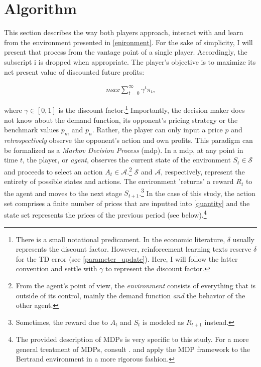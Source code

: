 \section{Algorithm}\label{algorithm}

This section describes the way both players approach, interact with and learn from the environment presented in \autoref{enironment}. For the sake of simplicity, I will present that process from the vantage point of a single player. Accordingly, the subscript {i} is dropped when appropriate. The player's objective is to maximize its net present value of discounted future profits:

\begin{gather}\label{maximization}
max \sum_{t = 0}^{\infty} \gamma^t \pi_{t} \text{,}
\end{gather}

where $\gamma \in [0, 1]$ is the discount factor.\footnote{There is a small notational predicament. In the economic literature, $\delta$ usually represents the discount factor. However, reinforcement learning texts reserve $\delta$ for the TD error (see \autoref{parameter_update}). Here, I will follow the latter convention and settle with $\gamma$ to represent the discount factor.} Importantly, the decision maker does not know about the demand function, its opponent's pricing strategy or the benchmark values $p_m$ and $p_n$. Rather, the player can only input a price $p$ and \emph{retrospectively} observe the opponent's action and own profits. This paradigm can be formalized as a \emph{Markov Decision Process} (\gls{mdp}). In a \gls{mdp}, at any point in time $t$, the player, or \emph{agent}, observes the current state of the environment $S_t \in \mathcal{S}$ and proceeds to select an action $A_t \in \mathcal{A}$.\footnote{From the agent's point of view, the \emph{environment} consists of everything that is outside of its control, mainly the demand function \emph{and} the behavior of the other agent.} $\mathcal{S}$ and $\mathcal{A}$, respectively, represent the entirety of possible states and actions. The environment 'returns' a reward $R_t$ to the agent and moves to the next stage $S_{t+1}$.\footnote{Sometimes, the reward due to $A_t$ and $S_t$ is modeled as $R_{t+1}$ instead.} In the case of this study, the action set comprises a finite number of prices  that are inputted into \autoref{quantity} and the state set represents the prices of the previous period (see below).\footnote{The provided description of MDPs is very specific to this study. For a more general treatment of MDPs, consult \textcite{sutton_reinforcement_2018}. \textcite{calvano_algorithmic_2018} and \textcite{hettich} apply the MDP framework to the Bertrand environment in a more rigorous fashion.}

